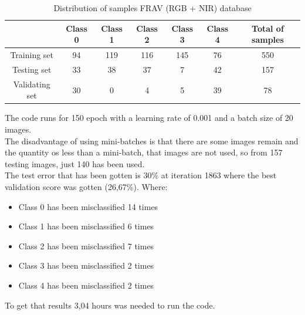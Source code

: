 \begin{table}[]
\centering
\label{FRAV_distribution1}
\begin{tabular}{c|ccccc|c|}
\cline{2-7}
                                     & \multicolumn{1}{c|}{Class 0} & \multicolumn{1}{c|}{Class 1} & \multicolumn{1}{c|}{Class 2} & \multicolumn{1}{c|}{Class 3} & Class 4 & Total of samples \\ \hline
\multicolumn{1}{|c|}{Training set}  & 94                           & 119                          & 116                          & 145                          & 76      & 550              \\ \cline{1-1}
\multicolumn{1}{|c|}{Testing set}    & 33                           & 38                           & 37                           & 7                            & 42      & 157              \\ \cline{1-1}
\multicolumn{1}{|c|}{Validating set} & 30                           & 0                            & 4                            & 5                            & 39      & 78               \\ \hline
\end{tabular} \caption{Distribution of samples FRAV (RGB + NIR) database}

\end{table}

The code runs for 150 epoch with a learning rate of 0.001 and a batch size of 20 images.\\

The disadvantage of using mini-batches is that there are some images remain and the quantity os less than a mini-batch, that images are not used, so from 157 testing images, just 140 has been used.\\

The test error that has been gotten is 30\% at iteration 1863 where the best validation score was gotten (26,67\%). Where:

\begin{itemize}
\item Class 0 has been misclassified  14 times
\item Class 1 has been misclassified  6 times
\item Class 2 has been misclassified  7 times
\item Class 3 has been misclassified  2 times
\item Class 4 has been misclassified  2 times
\end{itemize}

To get that results 3,04 hours was needed to run the code.\\

